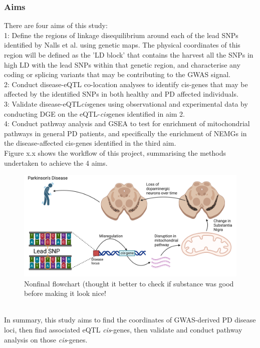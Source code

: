 \documentclass{article}
\begin{document}
\subsubsection{Aims}
\label{subsubsec:Aims}
There are four aims of this study:
\\1: Define the regions of linkage disequilibrium around each of the lead SNPs identified by Nalls et al.\cite{Nalls2019IdentificationStudies} using genetic maps. The physical coordinates of this region will be defined as the 'LD block' that contains the harvest all the SNPs in high LD with the lead SNPs within that genetic region, and characterise any coding or splicing variants that may be contributing to the GWAS signal.
\\2: Conduct disease-eQTL co-location analyses to identify cis-genes that may be affected by the identified SNPs in both healthy and PD affected individuals.
\\3: Validate disease-eQTL\textit{cis}genes using observational and experimental data by conducting DGE on the eQTL-\textit{cis}genes identified in aim 2.
\\4: Conduct pathway analysis and GSEA\cite{Subramanian2005GeneProfiles} to test for enrichment of mitochondrial pathways in general PD patients, and specifically the enrichment of NEMGs in the disease-affected cis-genes identified in the third aim.
\\Figure x.x shows the workflow of this project, summarising the methods undertaken to achieve the 4 aims.
\begin{figure}[h]
    \centering
    \includegraphics[width=1\linewidth]{Thesis/thesis images/Visualhypothesis.png}
    \caption{Nonfinal flowchart (thought it better to check if substance was good before making it look nice!}
    \label{fig:enter-label}
\end{figure}
\\In summary, this study aims to find the coordinates of GWAS-derived PD disease loci, then find associated eQTL \textit{cis}-genes, then validate and conduct pathway analysis on those \textit{cis}-genes. 
\newpage
\end{document}
